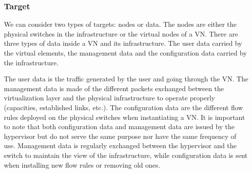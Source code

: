 \subsubsection{Target}
We can consider two types of targets: nodes or data.
The nodes are either the physical switches in the infrastructure or the virtual nodes of a VN.
There are three types of data inside a VN and its infrastructure.
The user data carried by the virtual elements, the management data and the configuration data carried by the infrastructure. 

The user data is the traffic generated by the user and going through the VN.
The management data is made of the different packets exchanged between the virtualization layer and the physical infrastructure to operate properly (capacities, established links, etc.).
The configuration data are the different flow rules deployed on the physical switches when instantiating a VN.
It is important to note that both configuration data and management data are issued by the hypervisor but do not serve the same purpose nor have the same frequency of use.
Management data is regularly exchanged between the hypervisor and the switch to maintain the view of the infrastructure, while configuration data is sent when installing new flow rules or removing old ones.


